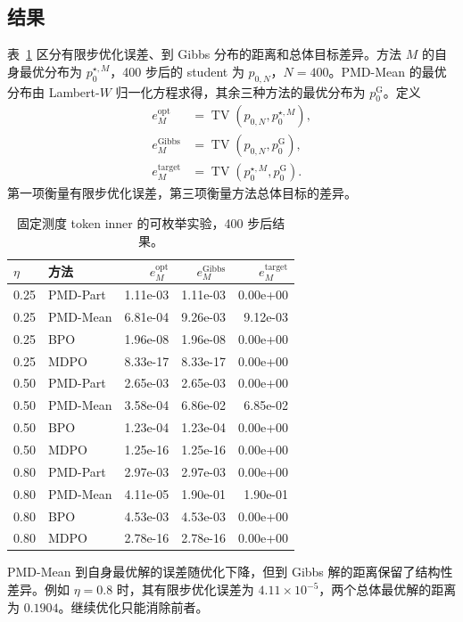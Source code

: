 \subsection{结果}

表~\ref{tab:toy-results} 区分有限步优化误差、到 Gibbs 分布的距离和总体目标差异。方法 $M$ 的自身最优分布为 $p_0^{\star,M}$，400 步后的 student 为 $p_{0,N}$，$N=400$。PMD-Mean 的最优分布由 Lambert-$W$ 归一化方程求得，其余三种方法的最优分布为 $p_0^{\mathrm G}$。定义
\begin{align*}
e^{\mathrm{opt}}_M&=\operatorname{TV}(p_{0,N},p_0^{\star,M}),\\
e^{\mathrm{Gibbs}}_M&=\operatorname{TV}(p_{0,N},p_0^{\mathrm G}),\\
e^{\mathrm{target}}_M&=\operatorname{TV}(p_0^{\star,M},p_0^{\mathrm G}).
\end{align*}
第一项衡量有限步优化误差，第三项衡量方法总体目标的差异。

\begin{table}[ht]
\centering
\caption{固定测度 token inner 的可枚举实验，400 步后结果。}
\label{tab:toy-results}
\begin{tabular}{llrrr}
\toprule
$\eta$ & 方法 & $e^{\mathrm{opt}}_M$ & $e^{\mathrm{Gibbs}}_M$ & $e^{\mathrm{target}}_M$\\
\midrule
0.25 & PMD-Part & 1.11e-03 & 1.11e-03 & 0.00e+00\\
0.25 & PMD-Mean & 6.81e-04 & 9.26e-03 & 9.12e-03\\
0.25 & BPO & 1.96e-08 & 1.96e-08 & 0.00e+00\\
0.25 & MDPO & 8.33e-17 & 8.33e-17 & 0.00e+00\\
0.50 & PMD-Part & 2.65e-03 & 2.65e-03 & 0.00e+00\\
0.50 & PMD-Mean & 3.58e-04 & 6.86e-02 & 6.85e-02\\
0.50 & BPO & 1.23e-04 & 1.23e-04 & 0.00e+00\\
0.50 & MDPO & 1.25e-16 & 1.25e-16 & 0.00e+00\\
0.80 & PMD-Part & 2.97e-03 & 2.97e-03 & 0.00e+00\\
0.80 & PMD-Mean & 4.11e-05 & 1.90e-01 & 1.90e-01\\
0.80 & BPO & 4.53e-03 & 4.53e-03 & 0.00e+00\\
0.80 & MDPO & 2.78e-16 & 2.78e-16 & 0.00e+00\\
\bottomrule
\end{tabular}
\end{table}

PMD-Mean 到自身最优解的误差随优化下降，但到 Gibbs 解的距离保留了结构性差异。例如 $\eta=0.8$ 时，其有限步优化误差为 $4.11\times10^{-5}$，两个总体最优解的距离为 $0.1904$。继续优化只能消除前者。

